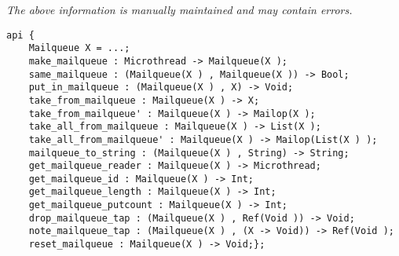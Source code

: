 \label{pkg:mailqueue}

{\tiny \it The above information is manually maintained and may contain errors.}
\begin{verbatim}
api {
    Mailqueue X = ...;
    make_mailqueue : Microthread -> Mailqueue(X );
    same_mailqueue : (Mailqueue(X ) , Mailqueue(X )) -> Bool;
    put_in_mailqueue : (Mailqueue(X ) , X) -> Void;
    take_from_mailqueue : Mailqueue(X ) -> X;
    take_from_mailqueue' : Mailqueue(X ) -> Mailop(X );
    take_all_from_mailqueue : Mailqueue(X ) -> List(X );
    take_all_from_mailqueue' : Mailqueue(X ) -> Mailop(List(X ) );
    mailqueue_to_string : (Mailqueue(X ) , String) -> String;
    get_mailqueue_reader : Mailqueue(X ) -> Microthread;
    get_mailqueue_id : Mailqueue(X ) -> Int;
    get_mailqueue_length : Mailqueue(X ) -> Int;
    get_mailqueue_putcount : Mailqueue(X ) -> Int;
    drop_mailqueue_tap : (Mailqueue(X ) , Ref(Void )) -> Void;
    note_mailqueue_tap : (Mailqueue(X ) , (X -> Void)) -> Ref(Void );
    reset_mailqueue : Mailqueue(X ) -> Void;};
\end{verbatim}
